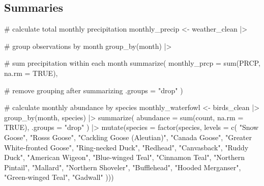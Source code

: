 \documentclass[
  letterpaper,
  DIV=11,
  numbers=noendperiod]{scrartcl}
\newenvironment{Shaded}{\begin{snugshade}}{\end{snugshade}}
\newcommand{\AttributeTok}[1]{\textcolor[rgb]{0.40,0.45,0.13}{#1}}
\newcommand{\CommentTok}[1]{\textcolor[rgb]{0.37,0.37,0.37}{#1}}
\newcommand{\ConstantTok}[1]{\textcolor[rgb]{0.56,0.35,0.01}{#1}}
\newcommand{\FunctionTok}[1]{\textcolor[rgb]{0.28,0.35,0.67}{#1}}
\newcommand{\NormalTok}[1]{\textcolor[rgb]{0.00,0.23,0.31}{#1}}
\newcommand{\OtherTok}[1]{\textcolor[rgb]{0.00,0.23,0.31}{#1}}
\newcommand{\SpecialCharTok}[1]{\textcolor[rgb]{0.37,0.37,0.37}{#1}}
\newcommand{\StringTok}[1]{\textcolor[rgb]{0.13,0.47,0.30}{#1}}
\begin{document}
\subsection{Summaries}\label{summaries}

\begin{Shaded}
\begin{Highlighting}[]
\CommentTok{\# calculate total monthly precipitation}
\NormalTok{monthly\_precip }\OtherTok{\textless{}{-}}\NormalTok{ weather\_clean }\SpecialCharTok{|\textgreater{}} 
  
  \CommentTok{\# group observations by month}
  \FunctionTok{group\_by}\NormalTok{(month) }\SpecialCharTok{|\textgreater{}} 
  
  \CommentTok{\# sum precipitation within each month}
  \FunctionTok{summarize}\NormalTok{(}
    \AttributeTok{monthly\_prcp =} \FunctionTok{sum}\NormalTok{(PRCP, }\AttributeTok{na.rm =} \ConstantTok{TRUE}\NormalTok{),}
    
    \CommentTok{\# remove grouping after summarizing}
    \AttributeTok{.groups =} \StringTok{"drop"}
\NormalTok{  )}
\end{Highlighting}
\end{Shaded}

\begin{Shaded}
\begin{Highlighting}[]
\CommentTok{\# calculate monthly abundance by species}
\NormalTok{monthly\_waterfowl }\OtherTok{\textless{}{-}}\NormalTok{ birds\_clean }\SpecialCharTok{|\textgreater{}}
  \FunctionTok{group\_by}\NormalTok{(month, species) }\SpecialCharTok{|\textgreater{}}
  \FunctionTok{summarize}\NormalTok{(}
    \AttributeTok{abundance =} \FunctionTok{sum}\NormalTok{(count, }\AttributeTok{na.rm =} \ConstantTok{TRUE}\NormalTok{),}
    \AttributeTok{.groups =} \StringTok{"drop"}
\NormalTok{  ) }\SpecialCharTok{|\textgreater{}}
  \FunctionTok{mutate}\NormalTok{(}\AttributeTok{species =} \FunctionTok{factor}\NormalTok{(species, }\AttributeTok{levels =} \FunctionTok{c}\NormalTok{(}
    \StringTok{"Snow Goose"}\NormalTok{,}
    \StringTok{"Ross\textquotesingle{}s Goose"}\NormalTok{,}
    \StringTok{"Cackling Goose (Aleutian)"}\NormalTok{,}
    \StringTok{"Canada Goose"}\NormalTok{,}
    \StringTok{"Greater White{-}fronted Goose"}\NormalTok{,}
    \StringTok{"Ring{-}necked Duck"}\NormalTok{,}
    \StringTok{"Redhead"}\NormalTok{,}
    \StringTok{"Canvasback"}\NormalTok{,}
    \StringTok{"Ruddy Duck"}\NormalTok{,}
    \StringTok{"American Wigeon"}\NormalTok{,}
    \StringTok{"Blue{-}winged Teal"}\NormalTok{,}
    \StringTok{"Cinnamon Teal"}\NormalTok{,}
    \StringTok{"Northern Pintail"}\NormalTok{,}
    \StringTok{"Mallard"}\NormalTok{,}
    \StringTok{"Northern Shoveler"}\NormalTok{,}
    \StringTok{"Bufflehead"}\NormalTok{,}
    \StringTok{"Hooded Merganser"}\NormalTok{,}
    \StringTok{"Green{-}winged Teal"}\NormalTok{,}
    \StringTok{"Gadwall"}
\NormalTok{  )))}
\end{Highlighting}
\end{Shaded}
\end{document}

